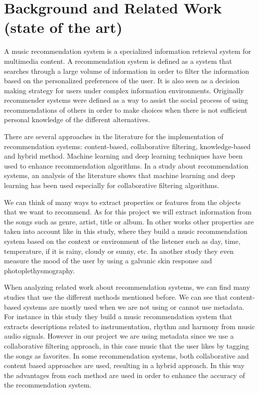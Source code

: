 \documentclass{jot}
\begin{document}
\section{Background and Related Work (state of the art)}
A music recommendation system is a specialized information retrieval system for multimedia content\cite{chung_kim_2018}. A recommendation system\cite{isinkaye_folajimi_ojokoh_2015} is defined as a system that searches through a large volume of information in order to filter the information based on the personalized preferences of the user. It is also seen as a decision making strategy for users under complex information environments. Originally recommender systems were defined as a way to assist the social process of using recommendations of others in order to make choices when there is not sufficient personal knowledge of the different alternatives\cite{resnick_varian_1997}.

There are several approaches in the literature for the implementation of recommendation systems: content-based, collaborative filtering, knowledge-based and hybrid method. Machine learning and deep learning techniques have been used to enhance recommendation algorithms. In a study about recommendation systems\cite{singhal_sinha_pant_2017}, an analysis of the literature shows that machine learning and deep learning has been used especially for collaborative filtering algorithms.

We can think of many ways to extract properties or features from the objects that we want to recommend. As for this project we will extract information from the songs such as genre, artist, title or album. In other works other properties are taken into account like in this study\cite{park_yoo_cho_2006}, where they build a music recommendation system based on the context or environment of the listener such as day, time, temperature, if it is rainy, cloudy or sunny, etc. In another study\cite{ayata_yaslan_kamasak_2018} they even measure the mood of the user by using a galvanic skin response and photoplethysmography.

When analyzing related work about recommendation systems, we can find many studies that use the different methods mentioned before. We can see that content-based systems are mostly used when we are not using or cannot use metadata. For instance in this study\cite{cano_koppenberger_wack_2005} they build a music recommendation system that extracts descriptions related to instrumentation, rhythm and harmony from music audio signals. However in our project we are using metadata since we use a collaborative filtering approach, in this case music that the user likes by tagging the songs as favorites. In some recommendation systems\cite{choi_yoo_kim_suh_2012}\cite{debnath_ganguly_mitra_2008}, both collaborative and content based approaches are used, resulting in a hybrid approach. In this way the advantages from each method are used in order to enhance the accuracy of the recommendation system.
\end{document}
